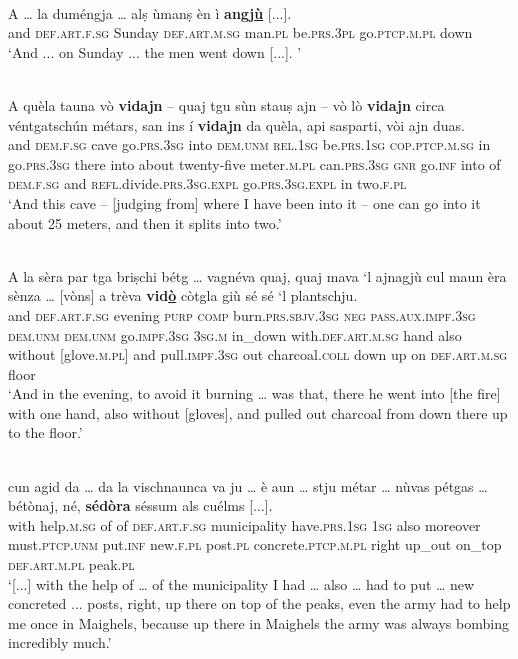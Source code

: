\ea
\label{}
\\
\gll A … la duméngja … alṣ ùmanṣ èn ì \textbf{angj\underline{ù}} [...].\\
and {} \textsc{def.art.f.sg} Sunday {} \textsc{def.art.m.sg} man.\textsc{pl} be.\textsc{prs.3pl} go.\textsc{ptcp.m.pl} down\\
\glt `And ... on Sunday ... the men went down [...]. '
\z

\ea
\label{}
\\
\gll A quèla tauna vò \textbf{vidajn} – quaj tgu sùn stauṣ ajn – vò lò \textbf{vidajn} circa véntgatschún métars, san ins í \textbf{vidajn} da quèla, api sasparti, vòi ajn duas.\\
and \textsc{dem.f.sg} cave go.\textsc{prs.3sg} into {}  \textsc{dem.unm} \textsc{rel.1sg} be.\textsc{prs.1sg} \textsc{cop.ptcp.m.sg} in {} go.\textsc{prs.3sg} there into about twenty-five meter.\textsc{m.pl} can.\textsc{prs.3sg} \textsc{gnr} go.\textsc{inf} into of \textsc{dem.f.sg} and \textsc{refl}.divide.\textsc{prs.3sg.expl} go.\textsc{prs.3sg.expl} in two.\textsc{f.pl}  \\
\glt `And this cave – [judging from] where I have been into it – one can go into it about 25 meters, and then it splits into two.'
\z

\ea
\label{}
\\
\gll  A la sèra par tga briṣchi bétg … vagnéva quaj, quaj mava `l ajnagjù cul maun èra sènza … [vòns] a trèva \textbf{vid\underline{ò}} còtgla giù sé sé  `l plantschju.  \\
and \textsc{def.art.f.sg} evening \textsc{purp} \textsc{comp} burn.\textsc{prs.sbjv.3sg} \textsc{neg} {} \textsc{pass.aux.impf.3sg} \textsc{dem.unm} \textsc{dem.unm} go.\textsc{impf.3sg} \textsc{3sg.m} in\_down with.\textsc{def.art.m.sg} hand also without {} [glove.\textsc{m.pl}] and pull.\textsc{impf.3sg} out charcoal.\textsc{coll} down up on \textsc{def.art.m.sg} floor  \\
\glt `And in the evening, to avoid it burning … was that, there he went into [the fire] with one hand, also without [gloves], and pulled out charcoal from down there up to the floor.'
\z


\ea
\label{}
\\
\gll  [...] cun agid da … da la vischnaunca va ju … è aun … stju métar … nùvas pétgas … bétònaj\footnotemark,  né, \textbf{sédòra} séssum als cuélms [...].\\
{} with help.\textsc{m.sg} of {} of  \textsc{def.art.f.sg} municipality have.\textsc{prs.1sg} \textsc{1sg} {} also moreover {} must.\textsc{ptcp.unm} put.\textsc{inf} {} new.\textsc{f.pl}  post.\textsc{pl} {} concrete.\textsc{ptcp.m.pl} right up\_out  on\_top \textsc{def.art.m.pl} peak.\textsc{pl}\\
\glt `[...] with the help of … of the municipality I had … also … had to put … new concreted ... posts, right, up there on top of the peaks, even the army had to help me once in Maighels, because up there in Maighels the army was always bombing incredibly much.'
\z

